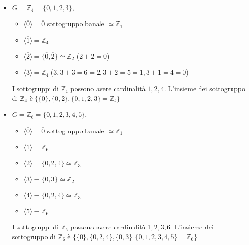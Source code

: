 \documentclass[../main.tex]{subfiles}
\begin{document}
\begin{example}
    \
    \begin{itemize}
        \item $G = \mathbb{Z}_4 = \{\overline{0}, \overline{1}, \overline{2}, \overline{3}\}$, \
              \begin{itemize}
                  \item $\langle \overline{0} \rangle = {\overline{0}}$ sottogruppo banale $\simeq \mathbb{Z}_1$
                  \item $\langle \overline{1} \rangle = \mathbb{Z}_4$
                  \item $\langle \overline{2} \rangle = \{\overline{0}, \overline{2}\} \simeq \mathbb{Z}_2$ ($2+2=0$)
                  \item $\langle \overline{3} \rangle = \mathbb{Z}_4$ ($3 , 3+3=6=2, 3+2=5=1, 3+1=4=0$)
              \end{itemize}
              I sottogruppi di $\mathbb{Z}_4$ possono avere cardinalità $1,2,4$. L'insieme
              dei sottogruppo di $\mathbb{Z}_4$ è $\{\{\overline{0}\}, \{\overline{0}, \overline{2}\},
                  \{\overline{0}, \overline{1}, \overline{2}, \overline{3}\}= \mathbb{Z}_4\}$
        \item $G = \mathbb{Z}_6 = \{\overline{0}, \overline{1}, \overline{2}, \overline{3}, \overline{4}, \overline{5}\}$, \
              \begin{itemize}
                  \item $\langle \overline{0} \rangle = {\overline{0}}$ sottogruppo banale $\simeq \mathbb{Z}_1$
                  \item $\langle \overline{1} \rangle = \mathbb{Z}_6$
                  \item $\langle \overline{2} \rangle = \{\overline{0}, \overline{2}, \overline{4}\} \simeq \mathbb{Z}_3$
                  \item $\langle \overline{3} \rangle = \{\overline{0}, \overline{3}\} \simeq \mathbb{Z}_2$
                  \item $\langle \overline{4} \rangle = \{\overline{0}, \overline{2}, \overline{4}\} \simeq \mathbb{Z}_3$
                  \item $\langle \overline{5} \rangle = \mathbb{Z}_6$
              \end{itemize}
              I sottogruppi di $\mathbb{Z}_6$ possono avere cardinalità $1,2,3,6$. L'insieme dei sottogruppo di $\mathbb{Z}_6$ è $\{\{\overline{0}\}, \{\overline{0}, \overline{2}, \overline{4}\}, \{\overline{0}, \overline{3}\}, \{\overline{0}, \overline{1}, \overline{2}, \overline{3}, \overline{4}, \overline{5}\}= \mathbb{Z}_6\}$
    \end{itemize}
\end{example}
\end{document}
